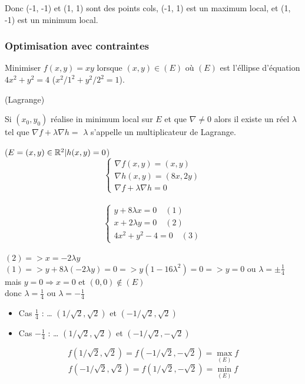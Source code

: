 	Donc (-1, -1) et (1, 1) sont des points cols, (-1, 1) est un maximum local, et (1, -1) est un minimum local.
	
	
		\subsubsection{Optimisation avec contraintes}
		
		Minimiser $f(x, y) = xy$ lorsque $(x, y) \in (E)$ où $(E)$ est l'éllipse d'équation $4x^2+y^2=4$ ($x^2/1^2 + y^2/2^2 = 1$).
		
		\begin{theoreme} (Lagrange)
		
		Si $(x_0, y_0)$ réalise in minimum local sur $E$ et que $\nabla \neq 0$ alors il existe un réel $\lambda$ tel que $\nabla f + \lambda \nabla h = $
		$\lambda$ s'appelle un multiplicateur de Lagrange.
		\end{theoreme}
		
		($E = {(x, y) \in \mathbb{R}^2 | h(x, y) = 0}$)\\
		\[\begin{cases} \nabla f(x, y) = ( x, y) \\ \nabla h(x, y) = (8x, 2y)\\ \nabla f + \lambda \nabla h = 0 \end{cases} \] \\
		\[\begin{cases} y+8\lambda x=0 \quad(1) \\ x+2\lambda y=0 \quad(2) \\ 4x^2+y^2-4=0 \quad(3)\end{cases}\] \\
		$(2) => x = -2\lambda y$ \\
		$(1) => y+8\lambda (-2\lambda y) = 0 => y(1-16 \lambda^2) = 0 => y=0$ ou $\lambda = \pm \frac{1}{4}$ \\
		mais $y=0 \Rightarrow x=0$ et $(0, 0) \not \in (E)$ \\
		donc $\lambda = \frac{1}{4}$ ou $\lambda = -\frac{1}{4}$
		
		\begin{itemize}
		\item Cas $\frac{1}{4}$ : 
		\dots
		$(1/ \sqrt{2}, \sqrt{2})$ et $(-1/ \sqrt{2}, \sqrt{2})$
		\item Cas $-\frac{1}{4}$ : 
		\dots
		$(1/ \sqrt{2}, \sqrt{2})$ et $(-1/ \sqrt{2}, -\sqrt{2})$
		\end{itemize}
		
		\[f(1/ \sqrt{2}, \sqrt{2}) = f(-1/ \sqrt{2}, -\sqrt{2}) = \max_{(E)} f\]
		\[f(-1/ \sqrt{2}, \sqrt{2}) = f(1/ \sqrt{2}, -\sqrt{2}) = \min_{(E)} f\]
		
